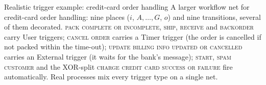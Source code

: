\begin{examplebox}{Realistic trigger example: credit-card order handling}
A larger workflow net for credit-card order handling: nine places ($i$, $A,\dots,G$, $o$) and nine transitions, several of them decorated. \textsc{pack complete or incomplete}, \textsc{ship}, \textsc{receive} and \textsc{backorder} carry User triggers; \textsc{cancel order} carries a Timer trigger (the order is cancelled if not packed within the time-out); \textsc{update billing info updated or cancelled} carries an External trigger (it waits for the bank's message); \textsc{start}, \textsc{spam customer} and the XOR-split \textsc{charge credit card success or failure} fire automatically. Real processes mix every trigger type on a single net.


\end{examplebox}
